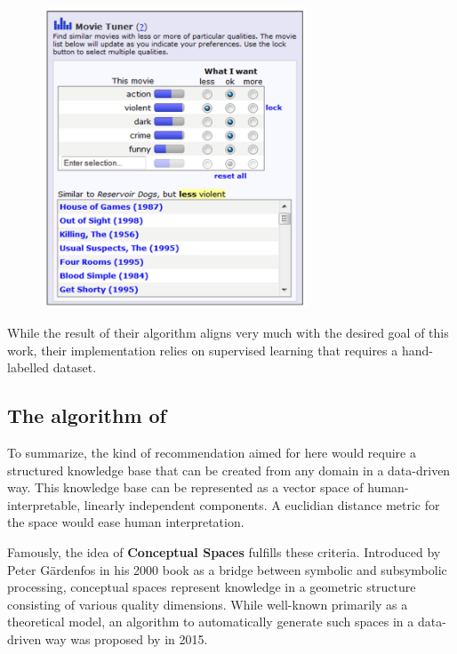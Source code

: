 \begin{figure}[H]
	\centering
	\includegraphics[width=0.7\textwidth]{graphics/stolenfigures/movietuner.png}
\end{figure}

While the result of their algorithm aligns very much with the desired goal of this work, their implementation relies on supervised learning that requires a hand-labelled dataset.

\subsection{The algorithm of \textcite{Derrac2015}}


To summarize, the kind of recommendation aimed for here would require a structured knowledge base that can be created from any domain in a data-driven way. This knowledge base can be represented as a vector space of human-interpretable, linearly independent components. A euclidian distance metric for the space would ease human interpretation. 

Famously, the idea of \textbf{Conceptual Spaces} fulfills these criteria. Introduced by Peter Gärdenfos in his 2000 book  \cite{Gardenfors2000a} as a bridge between symbolic and subsymbolic processing, conceptual spaces represent knowledge in a geometric structure consisting of various quality dimensions. While well-known primarily as a theoretical model, an algorithm to automatically generate such spaces in a data-driven way was proposed by \textcite{Derrac2015} in 2015.

